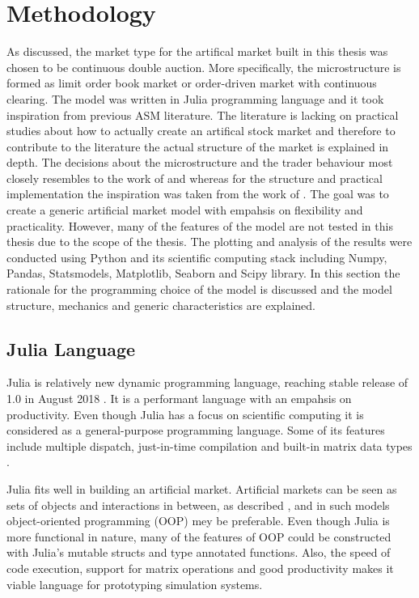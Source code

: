 
\section{Methodology}

As discussed, the market type for the artifical market built in this thesis was chosen 
to be continuous double auction. More specifically, the microstructure is formed as 
limit order book market or order-driven market with continuous clearing. The model was written in Julia
programming language and it took inspiration from previous ASM literature.
The literature is lacking on practical studies about how to actually create
an artifical stock market and therefore to contribute to the literature 
the actual structure of the market is explained in depth. The decisions 
about the microstructure and the trader behaviour most closely resembles to the 
work of \citet{Genoa01} and \citet{Raberto05} whereas for the structure and 
practical implementation the inspiration was taken from the work of \citet{Ben12}. 
The goal was to create a generic artificial market model with empahsis on flexibility 
and practicality. However, many of the features of the model are not tested in this thesis 
due to the scope of the thesis. The plotting and analysis of the results were 
conducted using Python and its scientific computing stack including Numpy, Pandas, 
Statsmodels, Matplotlib, Seaborn and Scipy library. In this section the rationale 
for the programming choice of the model is discussed and the model structure, 
mechanics and generic characteristics are explained.

\subsection{Julia Language}
Julia is relatively new dynamic programming language, 
reaching stable release of 1.0 in August 2018 \citep{JuliaV1}.
It is a performant language with an empahsis
on productivity. Even though Julia has a focus on scientific 
computing it is considered as a general-purpose programming
language. Some of its features include
multiple dispatch, just-in-time compilation and built-in
matrix data types \citep{Julia}.

Julia fits well in building an artificial market.
Artificial markets can be seen as sets of objects
and interactions in between, as described \citet{Ben12},
and in such models object-oriented programming (OOP)
mey be preferable. Even though Julia is more functional in nature, 
many of the features of OOP could be constructed with Julia's mutable structs 
and type annotated functions. Also, the speed of code execution, 
support for matrix operations and good productivity makes 
it viable language for prototyping simulation systems. 


